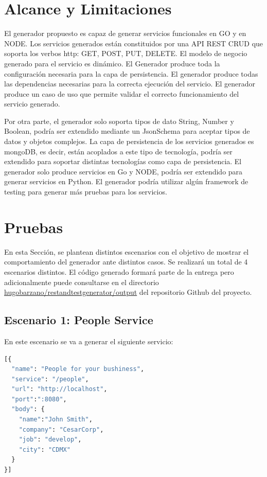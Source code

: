\documentclass[a4paper,11pt]{book}
\begin{document}
\section{Alcance y Limitaciones}

El generador propuesto es capaz de generar servicios funcionales en GO y en NODE. Los servicios generados están constituidos por una API REST CRUD que soporta los verbos http: GET, POST, PUT, DELETE.  El modelo de negocio generado para el servicio es dinámico. El Generador produce toda la configuración necesaria para la capa de persistencia. El generador produce todas las dependencias necesarias para la correcta ejecución del servicio. El generador produce un caso de uso que permite validar el correcto funcionamiento del servicio generado. 

Por otra parte, el generador solo soporta tipos de dato String, Number y Boolean, podría ser extendido mediante un JsonSchema para aceptar tipos de datos y objetos complejos. La capa de persistencia de los servicios generados es mongoDB, es decir, están acoplados a este tipo de tecnología, podría ser extendido para soportar distintas tecnologías como capa de persistencia. El generador solo produce servicios en Go y NODE, podría ser extendido para generar servicios en Python. El generador podría utilizar algún framework de testing para generar más pruebas para los servicios. 

\section{Pruebas}

En esta Sección, se plantean distintos escenarios con el objetivo de mostrar el comportamiento del generador ante distintos casos. Se realizará un total de 4 escenarios distintos. El código generado formará parte de la entrega pero adicionalmente puede consultarse en el directorio \href{https://github.com/hugobarzano/restandtestgenerator/tree/master/output}{hugobarzano/restandtestgenerator/output} del repositorio Github del proyecto. 

\subsection{Escenario 1: People Service}

En este escenario se va a generar el siguiente servicio:

\begin{lstlisting}[language=python,caption={ Ejemplo Entrada Generador: people.json }]
[{
  "name": "People for your bushiness",
  "service": "/people",
  "url": "http://localhost",
  "port":":8080",
  "body": {
    "name":"John Smith",
    "company": "CesarCorp",
    "job": "develop",
    "city": "CDMX"
  }
}]
\end{lstlisting}
\end{document}
